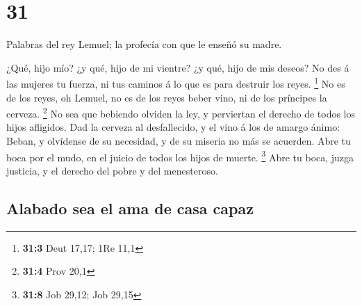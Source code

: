 \hypertarget{section-30}{%
\section{31}\label{section-30}}

 Palabras del rey Lemuel; la profecía con que le enseñó su
madre.

 ¿Qué, hijo mío? ¿y qué, hijo de mi vientre? ¿y qué, hijo de
mis deseos?  No des á las mujeres tu fuerza, ni tus caminos
á lo que es para destruir los reyes. \footnote{\textbf{31:3} Deut 17,17;
  1Re 11,1}  No es de los reyes, oh Lemuel, no es de los
reyes beber vino, ni de los príncipes la cerveza. \footnote{\textbf{31:4}
  Prov 20,1}  No sea que bebiendo olviden la ley, y
perviertan el derecho de todos los hijos afligidos.  Dad la
cerveza al desfallecido, y el vino á los de amargo ánimo: 
Beban, y olvídense de su necesidad, y de su miseria no más se acuerden.
 Abre tu boca por el mudo, en el juicio de todos los hijos
de muerte. \footnote{\textbf{31:8} Job 29,12; Job 29,15} 
Abre tu boca, juzga justicia, y el derecho del pobre y del menesteroso.

\hypertarget{alabado-sea-el-ama-de-casa-capaz}{%
\subsection{Alabado sea el ama de casa
capaz}\label{alabado-sea-el-ama-de-casa-capaz}}

